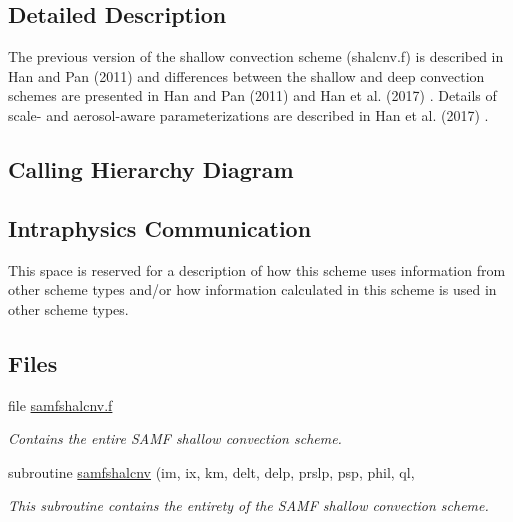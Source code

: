 \subsection{Detailed Description}
The previous version of the shallow convection scheme (shalcnv.\+f) is described in Han and Pan (2011) \cite{han_and_pan_2011} and differences between the shallow and deep convection schemes are presented in Han and Pan (2011) \cite{han_and_pan_2011} and Han et al. (2017) \cite{han_et_al_2017} . Details of scale-\/ and aerosol-\/aware parameterizations are described in Han et al. (2017) \cite{han_et_al_2017} .\hypertarget{group___g_f_s___n_s_s_t_diagram}{}\subsection{Calling Hierarchy Diagram}\label{group___g_f_s___n_s_s_t_diagram}
 \hypertarget{group___g_f_s___n_s_s_t_intraphysics}{}\subsection{Intraphysics Communication}\label{group___g_f_s___n_s_s_t_intraphysics}
This space is reserved for a description of how this scheme uses information from other scheme types and/or how information calculated in this scheme is used in other scheme types. \subsection*{Files}
\begin{DoxyCompactItemize}
\item 
file \hyperlink{samfshalcnv_8f}{samfshalcnv.\+f}
\begin{DoxyCompactList}\small\item\em Contains the entire S\+A\+MF shallow convection scheme. \end{DoxyCompactList}\end{DoxyCompactItemize}
\begin{DoxyCompactItemize}
\item 
subroutine \hyperlink{group___s_a_m_f__shal_ga8dbd74881cc19752c56c4fc49512e44c}{samfshalcnv} (im, ix, km, delt, delp, prslp, psp, phil, ql,
\begin{DoxyCompactList}\small\item\em This subroutine contains the entirety of the S\+A\+MF shallow convection scheme. \end{DoxyCompactList}\end{DoxyCompactItemize}


